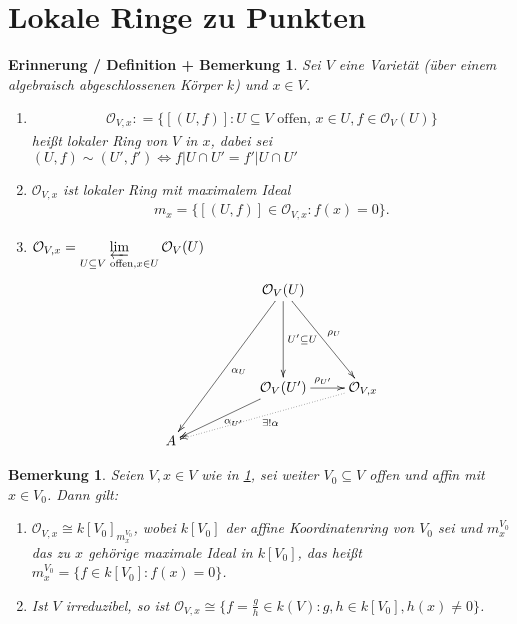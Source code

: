 \documentclass[a4paper,12pt]{report}
\theoremstyle{break}
\newtheorem{ErinnDefBem}[Def]{Erinnerung / Definition + Bemerkung}
\newtheorem{Bem}[Def]{Bemerkung}
\theoremstyle{nonumberbreak}
\theoremstyle{nonumberplain}
\newcommand{\defeqr}[0]{\mathrel{\mathop:}=}
\newcommand{\ilim}{\mathop{\varprojlim}\limits}
\begin{document}
\section{Lokale Ringe zu Punkten}
\begin{ErinnDefBem}
  \label{bem:14.1}
  Sei $V$ eine Varietät (über einem algebraisch abgeschlossenen Körper $k$) und $x\in V$.
  \begin{enumerate}
  \item
    \begin{align*}
      \mathcal{O}_{V,x}\defeqr\{[(U,f)]:U\subseteq V \text{ offen, } x\in U, f\in\mathcal{O}_V(U)\}
    \end{align*}
    heißt lokaler Ring von $V$ in $x$, dabei sei $(U,f)\sim (U',f')\Leftrightarrow f\vert U\cap U'=f'\vert U\cap U'$
  \item $\mathcal{O}_{V,x}$ ist lokaler Ring mit maximalem Ideal
    \begin{align*}
      m_x=\{[(U,f)]\in\mathcal{O}_{V,x}:f(x)=0\}.
    \end{align*}
  \item $\mathcal{O}_{V,x}=\ilim_{U\subseteq V \text{ offen},x\in U}\mathcal{O}_V(U)$ \\
    \begin{align*}
    \begin{xy}
      \xymatrix{
        & & \mathcal{O}_V(U)\ar[3,-2]^{\alpha_U}\ar[2,1]^{\rho_U}\ar[2,0]^{U'\subseteq U} & \\
        & & & \\
        & & \mathcal{O}_V(U')\ar[r]^{\rho_{U'}}\ar[1,-2]^{\alpha_{U'}} & \mathcal{O}_{V,x}\ar@{.>}[1,-3]^{\exists! \alpha} \\
        A & & & \\
      }
    \end{xy}
    \end{align*}
  \end{enumerate}
\end{ErinnDefBem}
\begin{Bem}
  \label{bem:14.2}
  Seien $V,x\in V$ wie in \ref{bem:14.1}, sei weiter $V_0\subseteq V$ offen und affin mit $x\in V_0$. Dann gilt: 
  \begin{enumerate}
  \item $\mathcal{O}_{V,x}\cong k[V_0]_{m_x^{V_0}}$, wobei $k[V_0]$ der affine Koordinatenring von $V_0$
    sei und $m_x^{V_0}$ das zu $x$ gehörige maximale Ideal in $k[V_0]$, das heißt $m_x^{V_0}=\{f\in k[V_0]:f(x)=0\}$.
  \item Ist $V$ irreduzibel, so ist $\mathcal{O}_{V,x}\cong \{f=\frac{g}{h}\in k(V):g,h\in k[V_0], h(x)\neq 0\}$.
  \end{enumerate}
\end{Bem}
\end{document}
